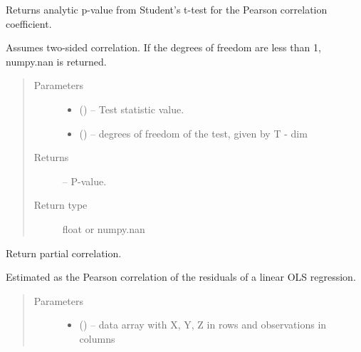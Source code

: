 \documentclass[letterpaper,10pt,english]{sphinxmanual}
\begin{document}
\begin{fulllineitems}
\begin{fulllineitems}
\begin{quote}
\begin{description}
\end{description}\end{quote}

\end{fulllineitems}


\begin{fulllineitems}
\label{\detokenize{index:tigramite.independence_tests.ParCorr.get_analytic_significance}}
Returns analytic p-value from Student's t-test for the Pearson
correlation coefficient.

Assumes two-sided correlation. If the degrees of freedom are less than
1, numpy.nan is returned.
\begin{quote}\begin{description}
\item[{Parameters}] \leavevmode\begin{itemize}
\item {} 
 () -- Test statistic value.

\item {} 
 () -- degrees of freedom of the test, given by T - dim

\end{itemize}

\item[{Returns}] \leavevmode
{} -- P-value.

\item[{Return type}] \leavevmode
float or numpy.nan

\end{description}\end{quote}

\end{fulllineitems}


\begin{fulllineitems}
\label{\detokenize{index:tigramite.independence_tests.ParCorr.get_dependence_measure}}
Return partial correlation.

Estimated as the Pearson correlation of the residuals of a linear
OLS regression.
\begin{quote}\begin{description}
\item[{Parameters}] \leavevmode\begin{itemize}
\item {} 
 () -- data array with X, Y, Z in rows and observations in columns


\end{itemize}
\end{description}
\end{quote}
\end{fulllineitems}
\end{fulllineitems}
\end{document}
